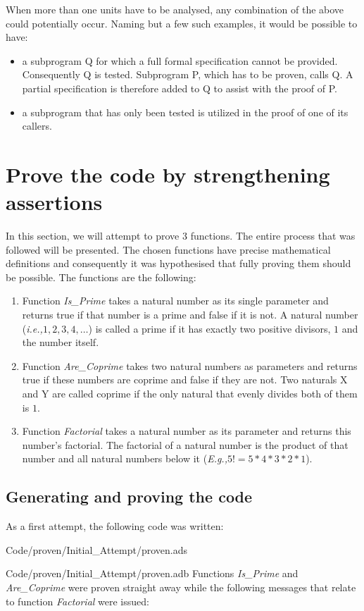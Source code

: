 \documentclass{llncs}
\newcommand{\ie}{\textit{i.e.,}\xspace}
\newcommand{\Eg}{\textit{E.g.,}\xspace}
\begin{document}
When more than one units have to be analysed, any combination of the above could
potentially occur. Naming but a few such examples, it would be possible to have:
\begin{itemize}
  \item a subprogram Q for which a full formal specification cannot be provided.
    Consequently Q is tested. Subprogram P, which has to be proven, calls Q.
    A partial specification is therefore added to Q to assist with the proof of P.

  \item a subprogram that has only been tested is utilized in the proof of one of its
    callers.
\end{itemize}



\section{Prove the code by strengthening assertions}
In this section, we will attempt to prove 3 functions. The entire process that
was followed will be presented. The chosen functions have precise mathematical
definitions and consequently it was hypothesised that fully proving them should
be possible. The functions are the following:
\begin{enumerate}
  \item Function \emph{Is\_Prime} takes a natural number as its single parameter
    and returns true if that number is a prime and false if it is not. A natural
    number (\ie $1, 2, 3, 4, \dots$) is called a prime if it has exactly two
    positive divisors, $1$ and the number itself.

  \item Function \emph{Are\_Coprime} takes two natural numbers as parameters and returns
    true if these numbers are coprime and false if they are not. Two naturals X and Y
    are called coprime if the only natural that evenly divides both of them is $1$.

  \item Function \emph{Factorial} takes a natural number as its parameter and returns
    this number's factorial. The factorial of a natural number is the product of that
    number and all natural numbers below it (\Eg $5! = 5 * 4 * 3 * 2 * 1$).
\end{enumerate}

\subsection{Generating and proving the code}
As a first attempt, the following code was written:

                {Code/proven/Initial_Attempt/proven.ads}

                {Code/proven/Initial_Attempt/proven.adb}
Functions \emph{Is\_Prime} and \emph{Are\_Coprime} were proven straight away while the
following messages that relate to function \emph{Factorial} were issued:
\end{document}

